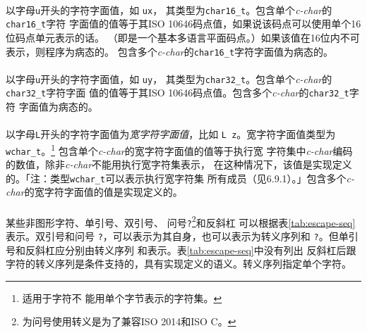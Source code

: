 \paragraph{}
以字母\texttt{u}开头的字符字面值，如
\texttt{u\qsgl{}x\qsgl}，
其类型为\texttt{char16\_t}。包含单个\textit{c-char}的\texttt{char16\_t}字符
字面值的值等于其ISO 10646码点值，如果说该码点可以使用单个16位码点单元表示的话。
（即是一个基本多语言平面码点。）如果该值在16位内不可表示，则程序为病态的。
包含多个\textit{c-char}的\texttt{char16\_t}字符字面值为病态的。

\paragraph{}
以字母\texttt{u}开头的字符字面值，如
\texttt{u\qsgl{}y\qsgl}，
其类型为\texttt{char32\_t}。包含单个\textit{c-char}的\texttt{char32\_t}字符字面
值的值等于其ISO 10646码点值。包含多个\textit{c-char}的\texttt{char32\_t}字符
字面值为病态的。

\paragraph{}
以字母\texttt{L}开头的字符字面值为\textit{宽字符字面值}，比如
\texttt{L\qsgl
z\qsgl}。宽字符字面值类型为\texttt{wchar\_t}。\footnote{适用于字符不
能用单个字节表示的字符集。} 包含单个\textit{c-char}的宽字符字面值的值等于执行宽
字符集中\textit{c-char}编码的数值，除非\textit{c-char}不能用执行宽字符集表示，
在这种情况下，该值是实现定义的。「注：类型\texttt{wchar\_t}可以表示执行宽字符集
所有成员（见6.9.1）。」包含多个\textit{c-char}的宽字符字面值的值是实现定义的。

\paragraph{}
某些非图形字符、单引号\texttt{\qsgl}、双引号\texttt{\qdbl}、
问号\texttt{?}\footnote{为问号使用转义是为了兼容ISO 2014和ISO C。}和反斜杠
\texttt{\bslh}可以根据表\ref{tab:escape-seq}表示。双引号\texttt{\qdbl}和问号
\texttt{?}，可以表示为其自身，也可以表示为转义序列\texttt{\bslh\qdbl}和
\texttt{\bslh ?}。但单引号\texttt{\qsgl}和反斜杠\texttt{\bslh}应分别由转义序列
\texttt{\bslh\qsgl}和\texttt{\bslh\bslh}表示。表\ref{tab:escape-seq}中没有列出
反斜杠后跟字符的转义序列是条件支持的，具有实现定义的语义。转义序列指定单个字符。

